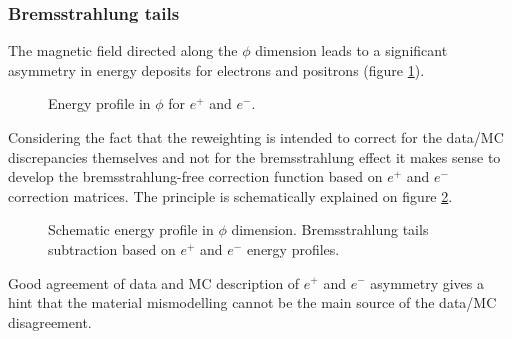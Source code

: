  \subsubsection{Bremsstrahlung tails}
The magnetic field directed along the $\phi$ dimension leads to a significant asymmetry in energy deposits for electrons and positrons (figure \ref{chargeAsym}). 
\begin{figure}[htbp]
\caption{Energy profile in $\phi$ for $e^+$ and $e^-$. }
\label{chargeAsym}
\end{figure}
Considering the fact that the reweighting is intended to correct for the data/MC discrepancies themselves and not for the bremsstrahlung effect it makes sense to develop the bremsstrahlung-free correction function based on $e^+$ and $e^-$ correction matrices. The principle is schematically explained on figure \ref{bstails}.\\
\begin{figure}[htbp]
\caption{Schematic energy profile in $\phi$ dimension. Bremsstrahlung tails subtraction based on $e^+$ and $e^-$ energy profiles.}
\label{bstails}
\end{figure}
Good agreement of data and MC description of $e^+$ and $e^-$ asymmetry gives a hint that the material mismodelling cannot be the main source of the data/MC disagreement.\\

